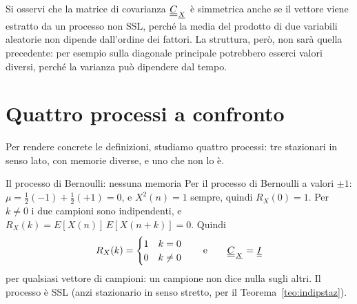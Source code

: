 Si osservi che la matrice di covarianza ${\mkern1mu\underline{\underline{C}}\mkern1mu}_{{\mkern1mu\underline{X}\mkern1mu}}$ è simmetrica anche se il vettore viene estratto da un
processo non SSL, perché la media del prodotto di due variabili aleatorie non dipende dall'ordine dei fattori. La
struttura, però, non sarà quella precedente: per esempio sulla diagonale principale potrebbero esserci valori diversi,
perché la varianza può dipendere dal tempo.

\section{Quattro processi a confronto}

Per rendere concrete le definizioni, studiamo quattro processi: tre stazionari in senso lato, con memorie diverse, e
uno che non lo è.

\begin{esempio}{Il processo di Bernoulli: nessuna memoria}
Per il processo di Bernoulli a valori $\pm 1$: $\mu = \frac12 (-1) + \frac12 (+1) = 0$, e $X^2(n) = 1$ sempre, quindi
$R_X(0) = 1$. Per $k \neq 0$ i due campioni sono indipendenti, e $R_X(k) = E[X(n)]\, E[X(n + k)] = 0$. Quindi
\[ R_X(k) = \begin{cases} 1 & k = 0 \\ 0 & k \neq 0 \end{cases} \qquad\text{e}\qquad {\mkern1mu\underline{\underline{C}}\mkern1mu}_{{\mkern1mu\underline{X}\mkern1mu}} = {\mkern1mu\underline{\underline{I}}\mkern1mu} \]
per qualsiasi vettore di campioni: un campione non dice nulla sugli altri. Il processo è SSL (anzi stazionario in senso
stretto, per il Teorema~\ref{teo:indipstaz}).
\end{esempio}

